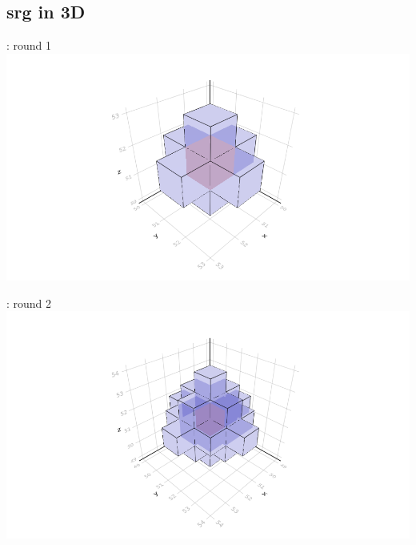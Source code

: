 \documentclass{beamer}
\begin{document}
\subsection{\Ac{srg} in 3D}
\begin{frame}{\insertsubsection : round 1}
  \includegraphics[trim=5cm 0.7cm 5cm 3cm, clip, width=1\linewidth]{algorithm_visualisation/srgsteps/srgstep0.png}\\
\end{frame}
\begin{frame}{\insertsubsection : round 2}
  \includegraphics[trim=5cm 0.7cm 5cm 3cm, clip, width=1\linewidth]{algorithm_visualisation/srgsteps/srgstep1.png}\\
\end{frame}
\end{document}
